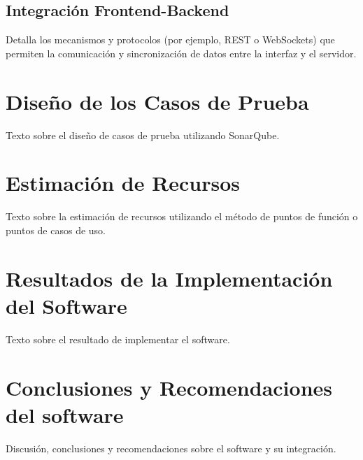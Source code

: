 \subsection{Integración Frontend-Backend}
Detalla los mecanismos y protocolos (por ejemplo, REST o WebSockets) que permiten la comunicación y sincronización de datos entre la interfaz y el servidor.


\section{Diseño de los Casos de Prueba}
Texto sobre el diseño de casos de prueba utilizando SonarQube.


\section{Estimación de Recursos}
Texto sobre la estimación de recursos utilizando el método de puntos de función o puntos de casos de uso.

\section{Resultados de la Implementación del Software}
Texto sobre el resultado de implementar el software.

\section{Conclusiones y Recomendaciones del software}
Discusión, conclusiones y recomendaciones sobre el software y su integración.
